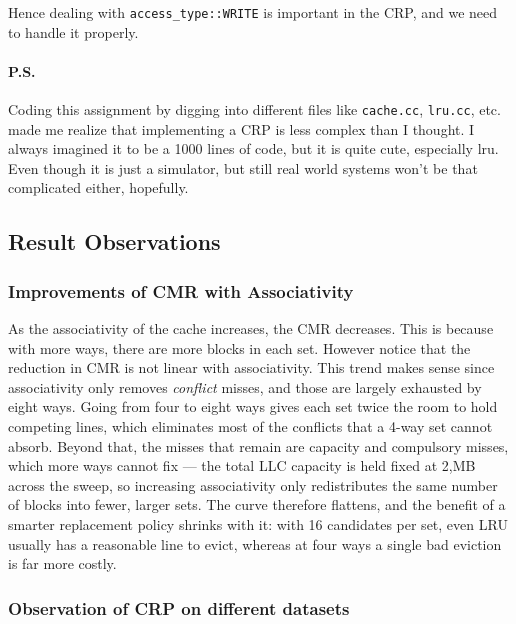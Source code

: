 \documentclass[11pt]{article}
\begin{document}
Hence dealing with \texttt{access\_type::WRITE} is important in the CRP, and we need to handle it properly.

\paragraph{P.S.} Coding this assignment by digging into different files like \texttt{cache.cc}, \texttt{lru.cc}, etc. made me realize that implementing a CRP is less complex than I thought. I always imagined it to be a 1000 lines of code, but it is quite cute, especially lru. Even though it is just a simulator, but still real world systems won't be that complicated either, hopefully. 

\subsection{Result Observations}

\subsubsection{Improvements of CMR with Associativity}

As the associativity of the cache increases, the CMR decreases. This is because with more ways, there are more blocks in each set. However notice that the reduction in CMR is not linear with associativity. This trend makes sense since associativity only removes \emph{conflict} misses, and those are largely exhausted by eight ways. Going from four to eight ways gives each set twice the room to hold competing lines, which eliminates most of the conflicts that a 4-way set cannot absorb. Beyond that, the misses that remain are capacity and compulsory misses, which more ways cannot fix --- the total LLC capacity is held fixed at 2,MB across the sweep, so increasing associativity only redistributes the same number of blocks into fewer, larger sets. The curve therefore flattens, and the benefit of a smarter replacement policy shrinks with it: with 16 candidates per set, even LRU usually has a reasonable line to evict, whereas at four ways a single bad eviction is far more costly.

\subsubsection{Observation of CRP on different datasets}
\end{document}
